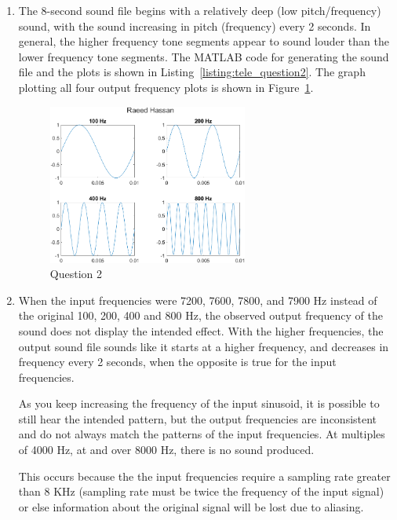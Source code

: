 \documentclass[12pt]{article}
\begin{document}
\begin{enumerate}
    \item
    The 8-second sound file begins with a relatively deep (low pitch/frequency) sound, with the sound increasing in pitch (frequency) every 2 seconds. In general, the higher frequency tone segments appear to sound louder than the lower frequency tone segments. The MATLAB code for generating the sound file and the plots is shown in Listing~\ref{listing:tele_question2}. The graph plotting all four output frequency plots is shown in Figure~\ref{fig:tele_question2}.
    
    \begin{figure}[!ht]
        \centering
        \includegraphics[width=0.62\textwidth]{tele_question2}
        \caption{\label{fig:tele_question2}Question 2}
    \end{figure}

    \item
    When the input frequencies were 7200, 7600, 7800, and 7900 Hz instead of the original 100, 200, 400 and 800 Hz, the observed output frequency of the sound does not display the intended effect. With the higher frequencies, the output sound file sounds like it starts at a higher frequency, and decreases in frequency every 2 seconds, when the opposite is true for the input frequencies. 
    
    As you keep increasing the frequency of the input sinusoid, it is possible to still hear the intended pattern, but the output frequencies are inconsistent and do not always match the patterns of the input frequencies. At multiples of 4000 Hz, at and over 8000 Hz, there is no sound produced. 
    
    This occurs because the the input frequencies require a sampling rate greater than 8 KHz (sampling rate must be twice the frequency of the input signal) or else information about the original signal will be lost due to aliasing. 


\end{enumerate}
\end{document}
